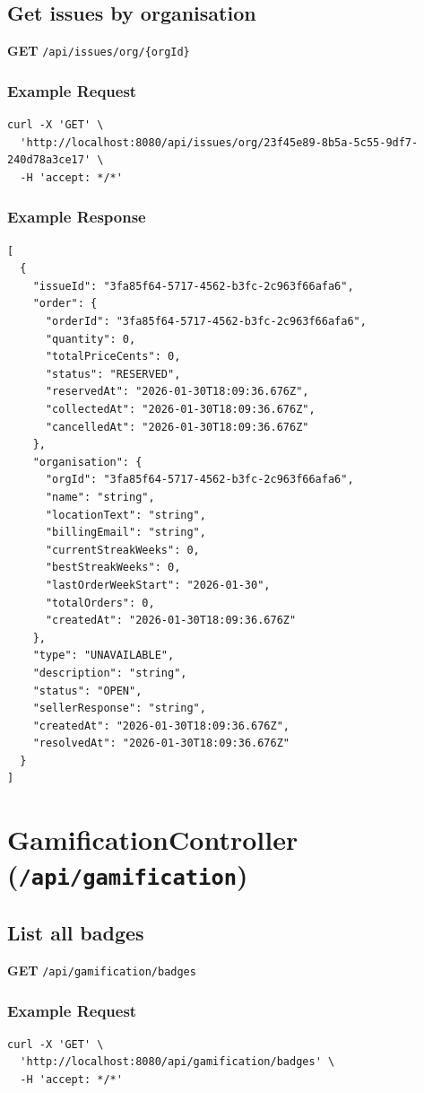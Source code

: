 \documentclass[a4paper,11pt]{article}
\begin{document}
\subsection{Get issues by organisation}
\textbf{GET} \texttt{/api/issues/org/\{orgId\}}
\subsubsection*{Example Request}
\begin{lstlisting}
curl -X 'GET' \
  'http://localhost:8080/api/issues/org/23f45e89-8b5a-5c55-9df7-240d78a3ce17' \
  -H 'accept: */*'
\end{lstlisting}

\subsubsection*{Example Response}
\begin{lstlisting}
[
  {
    "issueId": "3fa85f64-5717-4562-b3fc-2c963f66afa6",
    "order": {
      "orderId": "3fa85f64-5717-4562-b3fc-2c963f66afa6",
      "quantity": 0,
      "totalPriceCents": 0,
      "status": "RESERVED",
      "reservedAt": "2026-01-30T18:09:36.676Z",
      "collectedAt": "2026-01-30T18:09:36.676Z",
      "cancelledAt": "2026-01-30T18:09:36.676Z"
    },
    "organisation": {
      "orgId": "3fa85f64-5717-4562-b3fc-2c963f66afa6",
      "name": "string",
      "locationText": "string",
      "billingEmail": "string",
      "currentStreakWeeks": 0,
      "bestStreakWeeks": 0,
      "lastOrderWeekStart": "2026-01-30",
      "totalOrders": 0,
      "createdAt": "2026-01-30T18:09:36.676Z"
    },
    "type": "UNAVAILABLE",
    "description": "string",
    "status": "OPEN",
    "sellerResponse": "string",
    "createdAt": "2026-01-30T18:09:36.676Z",
    "resolvedAt": "2026-01-30T18:09:36.676Z"
  }
]
\end{lstlisting}

\section{GamificationController (\texttt{/api/gamification})}

\subsection{List all badges}
\textbf{GET} \texttt{/api/gamification/badges}

\subsubsection*{Example Request}
\begin{lstlisting}
curl -X 'GET' \
  'http://localhost:8080/api/gamification/badges' \
  -H 'accept: */*'
\end{lstlisting}
\end{document}

